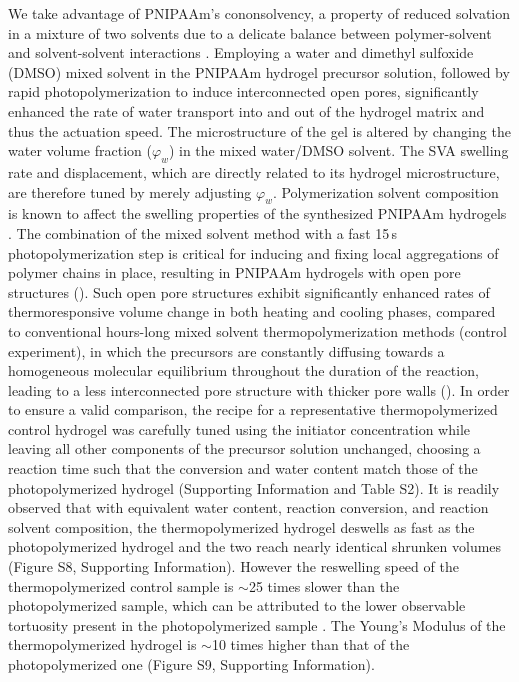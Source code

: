 We take advantage of PNIPAAm's cononsolvency, a property of reduced solvation in a mixture of two solvents due to a delicate balance between polymer-solvent and solvent-solvent interactions \cite{Pica2016}. Employing a water and dimethyl sulfoxide (DMSO) mixed solvent in the PNIPAAm hydrogel precursor solution, followed by rapid photopolymerization to induce interconnected open pores, significantly enhanced the rate of water transport into and out of the hydrogel matrix and thus the actuation speed. The microstructure of the gel is altered by changing the water volume fraction (\(\varphi_{w}\)) in the mixed water/DMSO solvent. The SVA swelling rate and displacement, which are directly related to its hydrogel microstructure, are therefore tuned by merely  adjusting \(\varphi_{w}\). Polymerization solvent composition is known to affect the swelling properties of the synthesized PNIPAAm hydrogels . 
The combination of the mixed solvent method with a fast 15\,s photopolymerization step is critical for inducing and fixing local aggregations of polymer chains in place,
resulting in PNIPAAm hydrogels with open pore structures (). Such open pore structures exhibit significantly enhanced rates of thermoresponsive volume change in both heating and cooling phases, compared to conventional hours-long mixed solvent thermopolymerization methods (control experiment), in which the precursors are constantly diffusing towards a homogeneous molecular equilibrium throughout the duration of the reaction, leading to a less interconnected pore structure with thicker pore walls ().
In order to ensure a valid comparison, the recipe for a representative thermopolymerized control hydrogel was carefully tuned using the initiator concentration while leaving all other components of the precursor solution unchanged, choosing a reaction time such that the conversion and water content match those of the photopolymerized hydrogel (Supporting Information and Table S2). It is readily observed that with equivalent water content, reaction conversion, and reaction solvent composition, the thermopolymerized hydrogel deswells as fast as the photopolymerized hydrogel  and the two reach nearly identical shrunken volumes (Figure S8, Supporting Information). However the reswelling speed of the thermopolymerized control sample is $\sim$25 times slower than the photopolymerized sample, which can be attributed to the lower observable tortuosity present in the photopolymerized sample . The Young's Modulus of the thermopolymerized hydrogel is $\sim$10 times higher than that of the photopolymerized one (Figure S9, Supporting Information). \\

